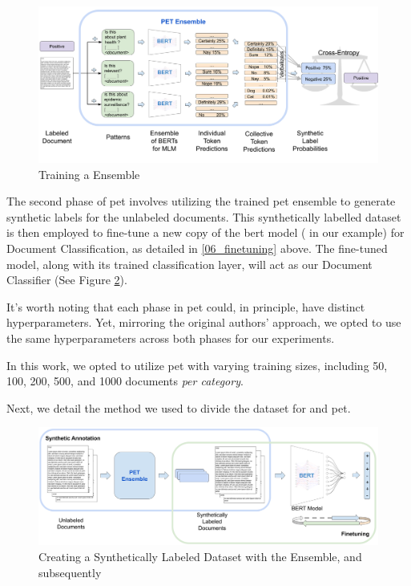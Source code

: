 




\begin{figure}
    \centering
    \includegraphics[width=\textwidth]{Figures/06/06_pet_training_1_pet_ensemble.png}
    \caption{Training a \PET{} Ensemble}
    \label{fig:06_pet_1_pet_ensemble}
\end{figure}


The second phase of \gls{pet} involves utilizing the trained \gls{pet} ensemble to generate synthetic labels for the unlabeled documents. 
This synthetically labelled dataset is then employed to fine-tune a new copy of the \gls{bert} model (\bertmultilingual{} in our example) for Document Classification, as detailed in \headerName{} \ref{06_finetuning} above. 
The fine-tuned model, along with its trained classification layer, will act as our Document Classifier (See Figure \ref{fig:06_pet_2_synthetic_finetuning}).

It's worth noting that each phase in \gls{pet} could, in principle, have distinct hyperparameters. Yet, mirroring the original authors' approach, we opted to use the same hyperparameters across both phases for our experiments.

In this work, we opted to utilize \gls{pet} with varying training sizes, including 50, 100, 200, 500, and 1000 documents \emph{per category}.

Next, we detail the method we used to divide the dataset for \finetuning{} and \gls{pet}.


\begin{figure}
    \centering
    \includegraphics[width=\textwidth]{Figures/06/06_pet_training_2_synthetic_finetuning.png}
    \caption{Creating a Synthetically Labeled Dataset with the \PET{} Ensemble, and subsequently \finetuning{}}
    \label{fig:06_pet_2_synthetic_finetuning}
\end{figure}

